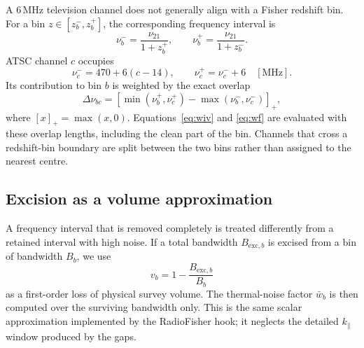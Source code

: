 A 6\,MHz television channel does not generally align with a Fisher
redshift bin. For a bin $z\in[z_b^-,z_b^+]$, the corresponding frequency
interval is
\begin{equation}
\label{eq:bin-freq}
\nu_b^- = \frac{\nu_{21}}{1+z_b^+}, \qquad
\nu_b^+ = \frac{\nu_{21}}{1+z_b^-}.
\end{equation}
ATSC channel $c$ occupies
\begin{equation}
\label{eq:channel-freq}
\nu_c^- = 470 + 6(c-14), \qquad
\nu_c^+ = \nu_c^- + 6 \quad [\mathrm{MHz}].
\end{equation}
Its contribution to bin $b$ is weighted by the exact overlap
\begin{equation}
\label{eq:overlap}
\Delta\nu_{bc} =
\left[\min(\nu_b^+,\nu_c^+) - \max(\nu_b^-,\nu_c^-)\right]_+,
\end{equation}
where $[x]_+=\max(x,0)$. Equations~\eqref{eq:wiv} and \eqref{eq:wf} are
evaluated with these overlap lengths, including the clean part of the
bin. Channels that cross a redshift-bin boundary are split between the
two bins rather than assigned to the nearest centre.

\subsection{Excision as a volume approximation}
\label{sec:excision}

A frequency interval that is removed completely is treated differently
from a retained interval with high noise. If a total bandwidth
$B_{\mathrm{exc},b}$ is excised from a bin of bandwidth $B_b$, we use
\begin{equation}
\label{eq:volume}
v_b = 1 - \frac{B_{\mathrm{exc},b}}{B_b}
\end{equation}
as a first-order loss of physical survey volume. The thermal-noise
factor $\bar{w}_b$ is then computed over the surviving bandwidth only.
This is the same scalar approximation implemented by the RadioFisher
hook; it neglects the detailed $k_\parallel$ window produced by the
gaps.

